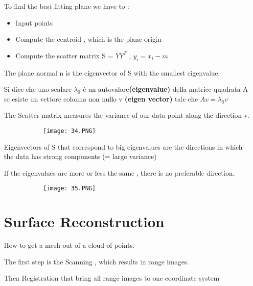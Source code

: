 \documentclass{article}
\begin{document}
To find the best fitting plane we have to :

\begin{itemize}
    \item Input points
    \item Compute the centroid , which is the plane origin
    \item Compute the scatter matrix S = $YY^T$  , $y_i = x_i - m$
\end{itemize}

The plane normal n is the eigenvector of S with the smallest eigenvalue.

Si dice che uno scalare $\lambda_0$ é un autovalore\textbf{(eigenvalue)} della matrice quadrata A se esiste un vettore colonna non nullo v \textbf{(eigen vector)} tale che $Av = \lambda_0v$

\vspace{50mm}

The Scatter matrix measures the variance of our data point along the direction v.

\begin{figure}[ht!]
  \centering
  \begin{subfigure}[b]{0.8\linewidth}
    \texttt{[image: 34.PNG]}
  \end{subfigure}
\end{figure}



Eigenvectors of S that correspond to big eigenvalues are the directions in which the data has strong components (= large variance)

If the eigenvalues are more or less the same , there is no preferable direction.

\begin{figure}[ht!]
  \centering
  \begin{subfigure}[b]{0.8\linewidth}
    \texttt{[image: 35.PNG]}
  \end{subfigure}
\end{figure}


\section{Surface Reconstruction}

How to get a mesh out of a cloud of points.

The first step is the Scanning , which results in range images.

Then Registration that bring all range images to one coordinate system 
\end{document}
